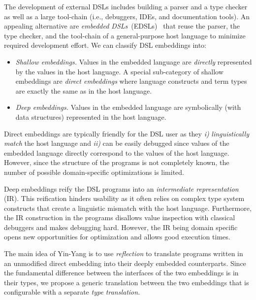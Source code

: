 \documentclass{llncs}
\newcommand{\tool}{Yin-Yang\xspace}
\begin{document}
The development of external DSLs includes building a parser and a type checker as well as a large tool-chain (i.e., debuggers, IDEs, and documentation tools). An appealing alternative are \emph{embedded DSLs}~(EDSLs)~\cite{Hudak96csur} that reuse the parser, the type checker, and the tool-chain of a general-purpose host language to minimize required development effort. We can classify DSL embeddings into:

\begin{itemize}

\item \emph{Shallow embeddings.} Values in the embedded language are \emph{directly} represented by the values in the host language. A special sub-category of shallow embeddings are \emph{direct embeddings} where language constructs and term types are exactly the same as in the host language.

\item \emph{Deep embeddings.}  Values in the embedded language are symbolically (with data structures) represented in the host language.

\end{itemize}

Direct embeddings are typically friendly for the DSL user as they \emph{i)} \emph{linguistically match} the host language and \emph{ii)} can be easily debugged since values of the embedded language directly correspond to the values of the host language. However, since the structure of the programs is not completely known, the number of possible domain-specific optimizations is limited.

Deep embeddings reify the DSL programs into an \emph{intermediate representation} (IR). This reification hinders usability as it often relies on complex type system constructs that create a linguistic mismatch with the host language. Furthermore, the IR construction in the programs disallows value inspection with classical debuggers and makes debugging hard. However, the IR being domain specific opens new opportunities for optimization and allows good execution times.


The main idea of \tool is to use \emph{reflection} to translate programs
written in an unmodified direct embedding into their deeply embedded
counterparts.  Since the fundamental difference between the interfaces of the
two embeddings is in their types, we propose a generic translation between
the two embeddings that is configurable with a separate \emph{type
translation}.
\end{document}
